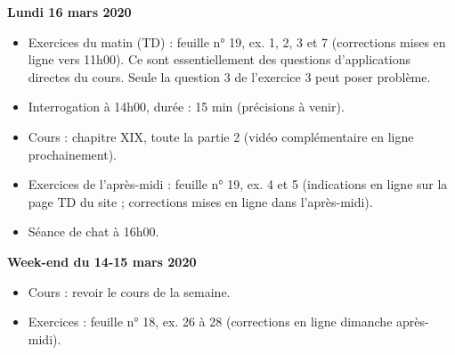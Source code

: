 \documentclass[12pt,a4paper]{article}
\begin{document}
\noindent\textbf{\bf Lundi 16 mars 2020}
\begin{itemize}
\item Exercices du matin (TD) : feuille n° 19, ex. 1, 2, 3 et 7 (corrections mises en ligne vers 11h00). Ce sont essentiellement des questions d'applications directes du cours. Seule la question 3 de l'exercice 3 peut poser problème.
\item Interrogation à 14h00, durée : 15 min (précisions à venir).
\item Cours : chapitre XIX, toute la partie 2 (vidéo complémentaire en ligne prochainement).
\item Exercices de l'après-midi : feuille n° 19, ex. 4 et 5 (indications en ligne sur la page TD du site ; corrections mises en ligne dans l'après-midi).
\item Séance de chat à 16h00.
\vspace{.4cm}
\end{itemize}

\noindent\textbf{Week-end du 14-15 mars 2020}
\begin{itemize}
\item Cours : revoir le cours de la semaine.
\item Exercices : feuille n° 18, ex. 26 à 28 (corrections en ligne dimanche après-midi).\vspace{.4cm}
\end{itemize}


\label{end}
\end{document}
